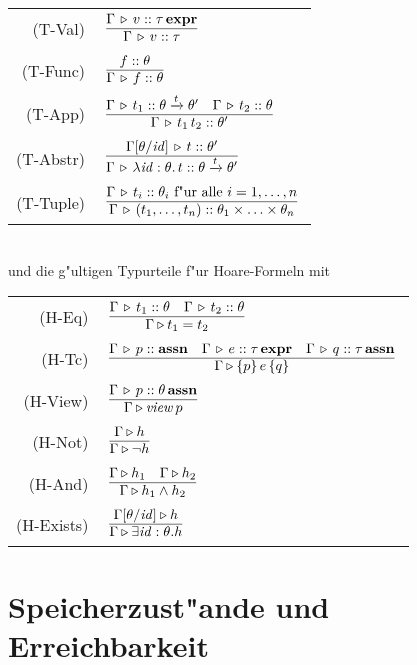 \documentclass[12pt,a4paper,bigheadings]{scrartcl}
\newcommand{\assn}{\ensuremath{\mathbf{assn}}}
\newcommand{\atype}[1]{#1\,\assn}
\newcommand{\bexpr}{\ensuremath{\mathbf{expr}}}
\newcommand{\etype}[1]{#1\,\bexpr}
\newcommand{\tto}{\ensuremath{\xrightarrow{t}}}
\newcommand{\view}[1]{\ensuremath{\app{\name{view}}{#1}}}
\newcommand{\RN}[1]{\mbox{{\sc (#1)}}}
\begin{document}
\begin{tabular}{rl}
  \RN{T-Val} & $\regel{\Tj{\Gamma}{v}{\etype{\tau}}}
                      {\Tj{\Gamma}{v}{\tau}}$ \\[1mm]
  \RN{T-Func} & $\regel{\tj{f}{\theta}}
                       {\Tj{\Gamma}{f}{\theta}}$ \\[1mm]
  \RN{T-App} & $\regel{\Tj{\Gamma}{t_1}{\theta \tto \theta'} \quad \Tj{\Gamma}{t_2}{\theta}}
                      {\Tj{\Gamma}{\app{t_1}{t_2}}{\theta'}}$ \\[1mm]
  \RN{T-Abstr} & $\regel{\Tj{\Gamma[\theta/\id]}{t}{\theta'}}
                        {\Tj{\Gamma}{\abstr{\id:\theta}{t}}{\theta \tto \theta'}}$ \\[1mm]
  \RN{T-Tuple} & $\regel{\Tj{\Gamma}{t_i}{\theta_i} \text{ f"ur alle } i=1,\ldots,n}
                        {\Tj{\Gamma}{(t_1,\ldots,t_n)}{\theta_1\times\ldots\times\theta_n}}$
\end{tabular} \\[3mm]
und die g"ultigen Typurteile f"ur Hoare-Formeln mit \\[3mm]
\begin{tabular}{rl}
  \RN{H-Eq} & $\regel{\Tj{\Gamma}{t_1}{\theta} \quad \Tj{\Gamma}{t_2}{\theta}}
                     {\Tjh{\Gamma}{t_1 = t_2}}$ \\[1mm]
  \RN{H-Tc} & $\regel{\Tj{\Gamma}{p}{\assn} \quad \Tj{\Gamma}{e}{\etype{\tau}} \quad \Tj{\Gamma}{q}{\atype{\tau}}}
                     {\Tjh{\Gamma}{\triple{p}{e}{q}}}$ \\[1mm]
  \RN{H-View} & $\regel{\Tj{\Gamma}{p}{\atype{\theta}}}
                       {\Tjh{\Gamma}{\view{p}}}$ \\[1mm]
  \RN{H-Not} & $\regel{\Tjh{\Gamma}{h}}
                      {\Tjh{\Gamma}{\neg h}}$ \\[1mm]
  \RN{H-And} & $\regel{\Tjh{\Gamma}{h_1} \quad \Tjh{\Gamma}{h_2}}
                      {\Tjh{\Gamma}{h_1 \wedge h_2}}$ \\[1mm]
  \RN{H-Exists} & $\regel{\Tjh{\Gamma[\theta/\id]}{h}}
                         {\Tjh{\Gamma}{\exists \id:\theta.h}}$
\end{tabular}


\section{Speicherzust"ande und Erreichbarkeit}
\end{document}
